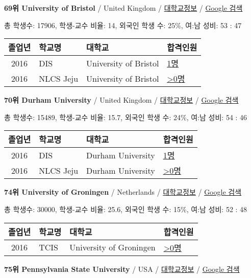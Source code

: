 \documentclass[13pt,]{article}
\begin{document}
\textbf{69위 University of Bristol} / United Kingdom /
\href{https://www.timeshighereducation.com/world-university-rankings/university-of-bristol?ranking-dataset=133819}{대학교정보}
/ \href{http://www.google.com/search?q=University+of+Bristol}{Google
검색}

총 학생수: 17906, 학생-교수 비율: 14, 외국인 학생 수: 25\%, 여:남 성비:
53 : 47

\begin{longtable}[]{@{}clll@{}}
\toprule
졸업년 & 학교명 & 대학교 & 합격인원\tabularnewline
\midrule
\endhead
2016 & DIS & University of Bristol &
\href{http://cafe.naver.com/assarabia/11591}{1명}\tabularnewline
2016 & NLCS Jeju & University of Bristol &
\href{http://cafe.naver.com/assarabia/11592}{\textgreater{}0명}\tabularnewline
\bottomrule
\end{longtable}

\textbf{70위 Durham University} / United Kingdom /
\href{https://www.timeshighereducation.com/world-university-rankings/durham-university?ranking-dataset=133819}{대학교정보}
/ \href{http://www.google.com/search?q=Durham+University}{Google 검색}

총 학생수: 15489, 학생-교수 비율: 15.7, 외국인 학생 수: 24\%, 여:남
성비: 54 : 46

\begin{longtable}[]{@{}clll@{}}
\toprule
졸업년 & 학교명 & 대학교 & 합격인원\tabularnewline
\midrule
\endhead
2016 & DIS & Durham University &
\href{http://cafe.naver.com/assarabia/11591}{1명}\tabularnewline
2016 & NLCS Jeju & Durham University &
\href{http://cafe.naver.com/assarabia/11592}{\textgreater{}0명}\tabularnewline
\bottomrule
\end{longtable}

\textbf{74위 University of Groningen} / Netherlands /
\href{https://www.timeshighereducation.com/world-university-rankings/university-of-groningen?ranking-dataset=133819}{대학교정보}
/ \href{http://www.google.com/search?q=University+of+Groningen}{Google
검색}

총 학생수: 30000, 학생-교수 비율: 25.6, 외국인 학생 수: 15\%, 여:남
성비: 52 : 48

\begin{longtable}[]{@{}clll@{}}
\toprule
졸업년 & 학교명 & 대학교 & 합격인원\tabularnewline
\midrule
\endhead
2016 & TCIS & University of Groningen &
\href{http://cafe.naver.com/assarabia/11598}{\textgreater{}0명}\tabularnewline
\bottomrule
\end{longtable}

\textbf{75위 Pennsylvania State University} / USA /
\href{https://www.timeshighereducation.com/world-university-rankings/pennsylvania-state-university?ranking-dataset=133819}{대학교정보}
/
\href{http://www.google.com/search?q=Pennsylvania+State+University}{Google
검색}
\end{document}

